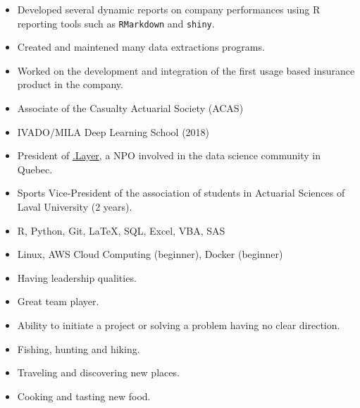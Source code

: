 \documentclass[10pt,a4paper,ragged2e]{altacv}
\begin{document}
\divider

\begin{itemize}
	\item Developed several dynamic reports on company performances using R reporting tools such as \texttt{RMarkdown} and \texttt{shiny}.
	\item Created and maintened many data extractions programs.
	\item Worked on the development and integration of the first usage based insurance product in the company.
\end{itemize}

\smallskip
\begin{itemize}
\item Associate of the Casualty Actuarial Society (ACAS)
\item IVADO/MILA Deep Learning School (2018)
\item President of \href{https://www.dotlayer.org/en/about/}{.Layer}, a NPO involved in the data science community in Quebec.
\item Sports Vice-President of the association of students in Actuarial Sciences of Laval University (2 years).
\end{itemize}

\smallskip
\begin{itemize}
\item R, Python, Git, LaTeX, SQL, Excel, VBA, SAS
\item Linux, AWS Cloud Computing (beginner), Docker (beginner)
\end{itemize}

\smallskip
\begin{itemize}
\item Having leadership qualities.
\item Great team player.
\item Ability to initiate a project or solving a problem having no clear direction.
\end{itemize}

\smallskip
\begin{itemize}
\item Fishing, hunting and hiking.
\item Traveling and discovering new places.
\item Cooking and tasting new food.
\end{itemize}
\end{document}
